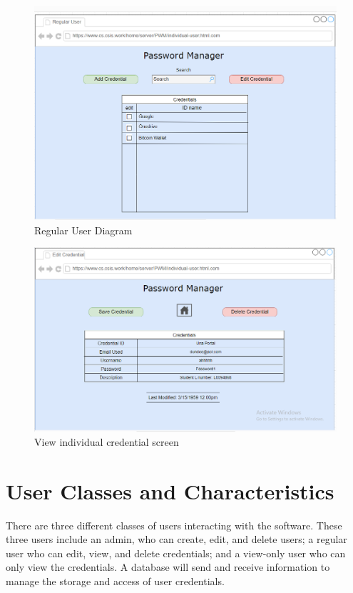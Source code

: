 \documentclass[letterpaper,12pt,oneside,listof=totoc]{scrreprt}
\begin{document}
\begin{figure}
\centering
\includegraphics[width=\linewidth]{UI.png}
\caption{Regular User Diagram}
\label{UI}
\end{figure}

\begin{figure}
\centering
\includegraphics[width=\linewidth]{UI2.png}
\caption{View individual credential screen}
\label{UI2}
\end{figure}

\section{User Classes and Characteristics}
There are three different classes of users interacting with the software. These three users include an admin, who can create, edit, and delete users; a regular user who can edit, view, and delete credentials; and a view-only user who can only view the credentials. A database will send and receive information to manage the storage and access of user credentials.
\end{document}
